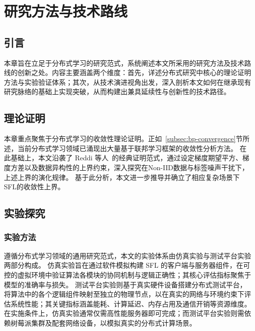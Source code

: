 
\chapter{研究方法与技术路线}
\section{引言}
本章旨在立足于分布式学习的研究范式，系统阐述本文所采用的研究方法及技术路线的创新之处。内容主要涵盖两个维度：首先，详述分布式研究中核心的理论证明方法与实验验证体系；其次，从技术演进视角出发，深入剖析本文如何在继承现有研究脉络的基础上实现突破，从而构建出兼具延续性与创新性的技术路径。
\section{理论证明}
本章重点聚焦于分布式学习的收敛性理论证明。正如~\ref{subsec:bp-convergence}节所述，当前分布式学习领域已涌现出大量基于联邦学习框架的收敛性分析方法。
在此基础上，本文沿袭了 Reddi 等人~\cite{reddi2020adaptive}的经典证明范式，通过设定梯度期望平方、梯度方差以及数据异构性的上界约束，深入探究在Non-IID数据与标签噪声干扰下，上述上界的演化规律。
基于此分析，本文进一步推导并确立了相应复杂场景下SFL的收敛性上界。
\section{实验探究}
\subsection{实验方法}
遵循分布式学习领域的通用研究范式，本文的实验体系由仿真实验与测试平台实验两部分构成。
仿真实验旨在通过软件模拟构建 SFL 的客户端与服务器组件，在可控的虚拟环境中验证算法各模块的协同机制与逻辑正确性；其核心评估指标聚焦于模型的准确率与损失。
测试平台实验则基于真实硬件设备搭建分布式测试平台，将算法中的各个逻辑组件映射至独立的物理节点，以在真实的网络与环境约束下评估系统性能；其关键指标涵盖能耗、计算延迟、内存占用及通信开销等资源维度。
在实施条件上，仿真实验通常仅需高性能服务器即可完成；而测试平台实验则需依赖树莓派集群及配套网络设备，以模拟真实的分布式计算场景。

